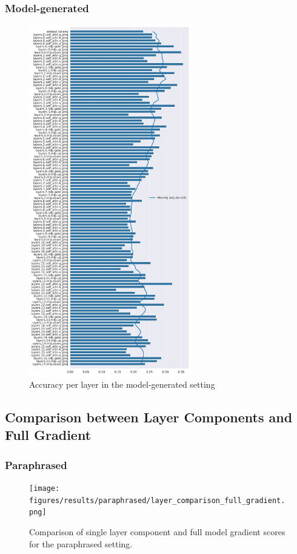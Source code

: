 \subsubsection{Model-generated}
\begin{figure}[ht]
    \centering
    \includegraphics[width=0.63\textwidth]{figures/results/model-generated/accuracy_per_layer.png}
    \caption{Accuracy per layer in the model-generated setting}
    \label{fig:model_generated_accuracy_per_layer}
\end{figure}

\subsection{Comparison between Layer Components and Full Gradient}

\subsubsection{Paraphrased}
\begin{figure}[ht]
    \centering
    \texttt{[image: figures/results/paraphrased/layer\_comparison\_full\_gradient.png]}
    \caption{Comparison of single layer component and full model gradient scores for the paraphrased setting.}
    \label{fig:paraphrased_layer_comparison_full_gradient}
\end{figure}

